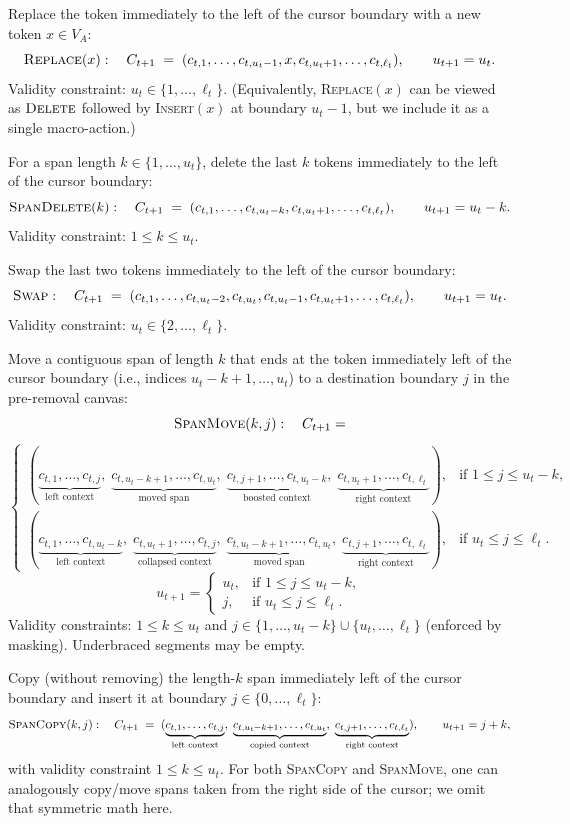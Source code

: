 \documentclass[11pt]{article}
\DeclareRobustCommand{\Insert}{\ifmmode\text{\textsc{Insert}}\else\textsc{Insert}\fi}
\DeclareRobustCommand{\Delete}{\ifmmode\text{\textsc{Delete}}\else\textsc{Delete}\fi}
\DeclareRobustCommand{\Replace}{\ifmmode\text{\textsc{Replace}}\else\textsc{Replace}\fi}
\DeclareRobustCommand{\SpanDelete}{\ifmmode\text{\textsc{SpanDelete}}\else\textsc{SpanDelete}\fi}
\DeclareRobustCommand{\Swap}{\ifmmode\text{\textsc{Swap}}\else\textsc{Swap}\fi}
\DeclareRobustCommand{\SpanMove}{\ifmmode\text{\textsc{SpanMove}}\else\textsc{SpanMove}\fi}
\DeclareRobustCommand{\SpanCopy}{\ifmmode\text{\textsc{SpanCopy}}\else\textsc{SpanCopy}\fi}
\begin{document}
Replace the token immediately to the left of the cursor boundary with a new token $x\in V_A$:
\[
\Replace(x):\quad
C_{t+1} \;=\;
(c_{t,1},\dots,c_{t,u_t-1},x,c_{t,u_t+1},\dots,c_{t,\ell_t}),
\qquad
u_{t+1}=u_t.
\]
Validity constraint: $u_t\in\{1,\dots,\ell_t\}$. (Equivalently, \Replace$(x)$ can be viewed as $\Delete$ followed by \Insert$(x)$ at boundary $u_t-1$, but we include it as a single macro-action.)

For a span length $k\in\{1,\dots,u_t\}$, delete the last $k$ tokens immediately to the left of the cursor boundary:
\[
\SpanDelete(k):\quad
C_{t+1} \;=\;
(c_{t,1},\dots,c_{t,u_t-k},c_{t,u_t+1},\dots,c_{t,\ell_t}),
\qquad
u_{t+1}=u_t-k.
\]
Validity constraint: $1\le k \le u_t$.

Swap the last two tokens immediately to the left of the cursor boundary:
\[
\Swap:\quad
C_{t+1} \;=\;
(c_{t,1},\dots,c_{t,u_t-2},c_{t,u_t},c_{t,u_t-1},c_{t,u_t+1},\dots,c_{t,\ell_t}),
\qquad
u_{t+1}=u_t.
\]
Validity constraint: $u_t\in\{2,\dots,\ell_t\}$.

Move a contiguous span of length $k$ that ends at the token immediately left of the cursor boundary (i.e., indices $u_t-k+1,\dots,u_t$) to a destination boundary $j$ in the pre-removal canvas:
\[
\SpanMove(k,j):\quad
C_{t+1}=
\]
\[
\begin{cases}
(\underbrace{c_{t,1},\dots,c_{t,j}}_{\text{left context}},\;
\underbrace{c_{t,u_t-k+1},\dots,c_{t,u_t}}_{\text{moved span}},\;
\underbrace{c_{t,j+1},\dots,c_{t,u_t-k}}_{\text{boosted context}},\;
\underbrace{c_{t,u_t+1},\dots,c_{t,\ell_t}}_{\text{right context}}),
& \text{if } 1\le j\le u_t-k,\\[1mm]
(\underbrace{c_{t,1},\dots,c_{t,u_t-k}}_{\text{left context}},\;
\underbrace{c_{t,u_t+1},\dots,c_{t,j}}_{\text{collapsed context}},\;
\underbrace{c_{t,u_t-k+1},\dots,c_{t,u_t}}_{\text{moved span}},\;
\underbrace{c_{t,j+1},\dots,c_{t,\ell_t}}_{\text{right context}}),
& \text{if } u_t\le j\le \ell_t.
\end{cases}
\]
\[
u_{t+1}=
\begin{cases}
u_t, & \text{if } 1\le j\le u_t-k,\\
j,   & \text{if } u_t\le j\le \ell_t.
\end{cases}
\]
Validity constraints: $1\le k\le u_t$ and $j\in\{1,\dots,u_t-k\}\cup\{u_t,\dots,\ell_t\}$ (enforced by masking). Underbraced segments may be empty.

Copy (without removing) the length-$k$ span immediately left of the cursor boundary and insert it at boundary $j\in\{0,\dots,\ell_t\}$:
\[
\SpanCopy(k,j):\quad
C_{t+1} \;=\;
(\underbrace{c_{t,1},\dots,c_{t,j}}_{\text{left context}},\;
\underbrace{c_{t,u_t-k+1},\dots,c_{t,u_t}}_{\text{copied context}},\;
\underbrace{c_{t,j+1},\dots,c_{t,\ell_t}}_{\text{right context}}),
\qquad
u_{t+1}=j+k,
\]
with validity constraint $1\le k\le u_t$.
For both \SpanCopy{} and \SpanMove{}, one can analogously copy/move spans taken from the right side of the cursor; we omit that symmetric math here.
\end{document}
